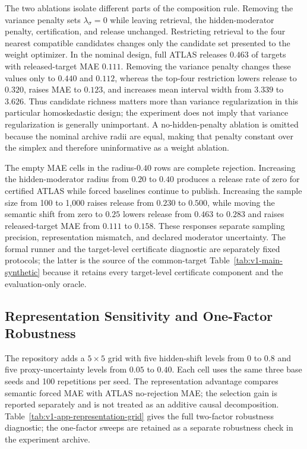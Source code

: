 \documentclass[11pt]{article}
\numberwithin{equation}{section}
\newcommand{\1}{\mathbf 1}
\begin{document}
The two ablations isolate different parts of the composition rule.  Removing the variance penalty sets $\lambda_\sigma=0$ while leaving retrieval, the hidden-moderator penalty, certification, and release unchanged.  Restricting retrieval to the four nearest compatible candidates changes only the candidate set presented to the weight optimizer.  In the nominal design, full ATLAS releases $0.463$ of targets with released-target MAE $0.111$.  Removing the variance penalty changes these values only to $0.440$ and $0.112$, whereas the top-four restriction lowers release to $0.320$, raises MAE to $0.123$, and increases mean interval width from $3.339$ to $3.626$.  Thus candidate richness matters more than variance regularization in this particular homoskedastic design; the experiment does not imply that variance regularization is generally unimportant.  A no-hidden-penalty ablation is omitted because the nominal archive radii are equal, making that penalty constant over the simplex and therefore uninformative as a weight ablation.

The empty MAE cells in the radius-$0.40$ rows are complete rejection.  Increasing the hidden-moderator radius from $0.20$ to $0.40$ produces a release rate of zero for certified ATLAS while forced baselines continue to publish.  Increasing the sample size from 100 to 1,000 raises release from $0.230$ to $0.500$, while moving the semantic shift from zero to $0.25$ lowers release from $0.463$ to $0.283$ and raises released-target MAE from $0.111$ to $0.158$.  These responses separate sampling precision, representation mismatch, and declared moderator uncertainty.  The formal runner and the target-level certificate diagnostic are separately fixed protocols; the latter is the source of the common-target Table~\ref{tab:v1-main-synthetic} because it retains every target-level certificate component and the evaluation-only oracle.


\subsection{Representation Sensitivity and One-Factor Robustness}
\label{app:representation-sensitivity}
\suppressfloats[t]

The repository adds a $5\times5$ grid with five hidden-shift levels from $0$ to $0.8$ and five proxy-uncertainty levels from $0.05$ to $0.40$.  Each cell uses the same three base seeds and 100 repetitions per seed.  The representation advantage compares semantic forced MAE with ATLAS no-rejection MAE; the selection gain is reported separately and is not treated as an additive causal decomposition. Table~\ref{tab:v1-app-representation-grid} gives the full two-factor robustness diagnostic; the one-factor sweeps are retained as a separate robustness check in the experiment archive.
\end{document}
